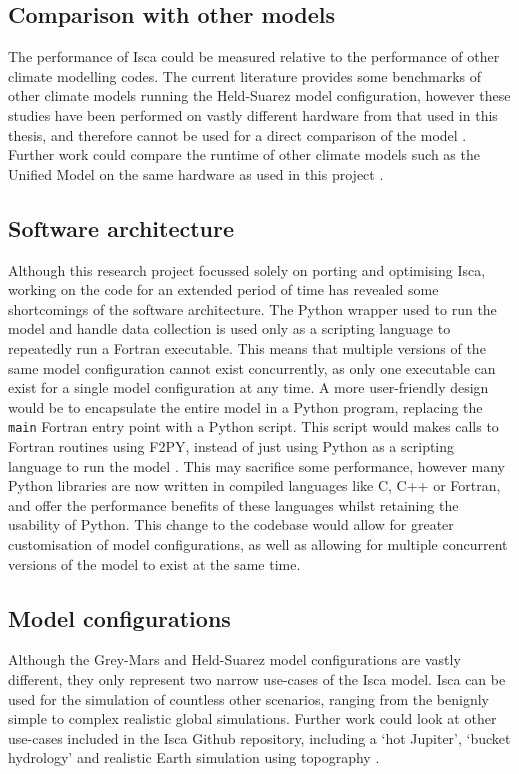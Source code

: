 \documentclass[a4paper,11pt]{report}
\begin{document}
\subsection{Comparison with other models}
The performance of Isca could be measured relative to the performance of other climate modelling codes. The current literature provides some benchmarks of other climate models running the Held-Suarez model configuration, however these studies have been performed on vastly different hardware from that used in this thesis, and therefore cannot be used for a direct comparison of the model \cite{schmidt2007benchmark}. Further work could compare the runtime of other climate models such as the Unified Model on the same hardware as used in this project \cite{met2019um}.

\subsection{Software architecture}
Although this research project focussed solely on porting and optimising Isca, working on the code for an extended period of time has revealed some shortcomings of the software architecture. The Python wrapper used to run the model and handle data collection is used only as a scripting language to repeatedly run a Fortran executable. This means that multiple versions of the same model configuration cannot exist concurrently, as only one executable can exist for a single model configuration at any time. A more user-friendly design would be to encapsulate the entire model in a Python program, replacing the \texttt{main} Fortran entry point with a Python script. This script would makes calls to Fortran routines using F2PY, instead of just using Python as a scripting language to run the model \cite{peterson2009f2py}. This may sacrifice some performance, however many Python libraries are now written in compiled languages like C, C++ or Fortran, and offer the performance benefits of these languages whilst retaining the usability of Python. This change to the codebase would allow for greater customisation of model configurations, as well as allowing for multiple concurrent versions of the model to exist at the same time. 

\subsection{Model configurations}
Although the Grey-Mars and Held-Suarez model configurations are vastly different, they only represent two narrow use-cases of the Isca model. Isca can be used for the simulation of countless other scenarios, ranging from the benignly simple to complex realistic global simulations. Further work could look at other use-cases included in the Isca Github repository, including a `hot Jupiter', `bucket hydrology' and realistic Earth simulation using topography \cite{isca2019github}. 
\end{document}
